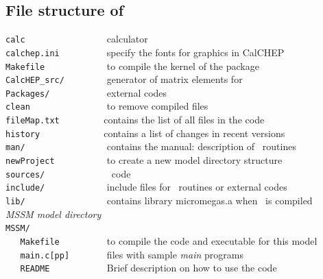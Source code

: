 \documentclass[12pt,a4paper]{article}
\begin{document}
\subsection{File structure of \micro}
\label{file_structure}
\verb|calc                | calculator\\
\verb|calchep.ini         | specify the fonts for graphics in CalCHEP\\
\verb|Makefile            |  to compile the kernel of the package               \\
\verb|CalcHEP_src/        |        generator of matrix elements for \micro   \\
\verb|Packages/           |        external codes    \\
\verb|clean               | to remove compiled files \\
\verb|fileMap.txt         |contains the list of all files in the code\\
\verb|history             |contains a list of changes in recent versions\\
\verb|man/                |    contains the manual: description of \micro\ routines \\
\verb|newProject          |     to create a new model directory   structure                           \\
\verb|sources/            |        \micro\ code                               \\
\verb|include/            |        include files for \micro\ routines or external codes                              \\
\verb|lib/                |        contains library micromegas.a when \micro\ is compiled                               \\
{\it MSSM model directory}                                                          \\
\verb|MSSM/               |                                                      \\
\verb|   Makefile         |  to compile the code and executable for  this model \\
\verb|   main.c[pp]       |       files with sample {\it main} programs      \\
\verb|   README           | Brief description on how to use the code \\
\end{document}
